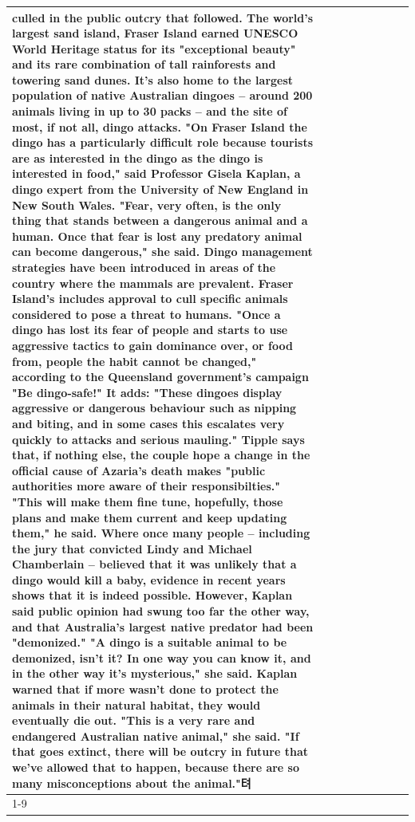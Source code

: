 \begin{table}[H]
\begin{tabular}{lllrlllll}
culled in the public outcry that followed. The world's largest sand island, Fraser Island earned UNESCO World Heritage status for its "exceptional beauty" and its rare combination of tall rainforests and towering sand dunes. It's also home to the largest population of native Australian dingoes -- around 200 animals living in up to 30 packs -- and the site of most, if not all, dingo attacks. "On Fraser Island the dingo has a particularly difficult role because tourists are as interested in the dingo as the dingo is interested in food," said Professor Gisela Kaplan, a dingo expert from the University of New England in New South Wales. "Fear, very often, is the only thing that stands between a dangerous animal and a human. Once that fear is lost any predatory animal can become dangerous," she said. Dingo management strategies have been introduced in areas of the country where the mammals are prevalent. Fraser Island's includes approval to cull specific animals considered to pose a threat to humans. "Once a dingo has lost its fear of people and starts to use aggressive tactics to gain dominance over, or food from, people the habit cannot be changed," according to the Queensland government's campaign "Be dingo-safe!" It adds: "These dingoes display aggressive or dangerous behaviour such as nipping and biting, and in some cases this escalates very quickly to attacks and serious mauling." Tipple says that, if nothing else, the couple hope a change in the official cause of Azaria's death makes "public authorities more aware of their responsibilties." "This will make them fine tune, hopefully, those plans and make them current and keep updating them," he said. Where once many people -- including the jury that convicted Lindy and Michael Chamberlain -- believed that it was unlikely that a dingo would kill a baby, evidence in recent years shows that it is indeed possible. However, Kaplan said public opinion had swung too far the other way, and that Australia's largest native predator had been "demonized." "A dingo is a suitable animal to be demonized, isn't it? In one way you can know it, and in the other way it's mysterious," she said. Kaplan warned that if more wasn't done to protect the animals in their natural habitat, they would eventually die out. "This is a very rare and endangered Australian native animal," she said. "If that goes extinct, there will be outcry in future that we've allowed that to happen, because there are so many misconceptions about the animal."텨 \\
\cline{1-9}

\end{tabular}
\end{table}
